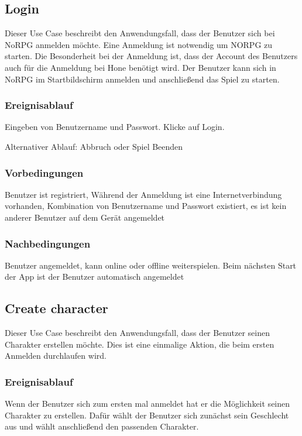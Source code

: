 	\subsection{Login}
		Dieser Use Case beschreibt den Anwendungsfall, dass der Benutzer sich bei NoRPG anmelden möchte. Eine Anmeldung ist notwendig um NORPG zu starten. Die Besonderheit bei der Anmeldung  ist, dass der Account des Benutzers auch für die Anmeldung bei Hone benötigt wird. Der Benutzer kann sich in NoRPG im Startbildschirm anmelden und anschließend das Spiel zu starten.
			
		\subsubsection{Ereignisablauf}
			Eingeben von Benutzername und Passwort.	Klicke auf Login.
			
			Alternativer Ablauf: Abbruch oder Spiel Beenden
			
		\subsubsection{Vorbedingungen}
			Benutzer ist registriert, Während der Anmeldung ist eine Internetverbindung vorhanden, Kombination von Benutzername und Passwort existiert, es ist kein anderer Benutzer auf dem Gerät angemeldet
			
		\subsubsection{Nachbedingungen}
			Benutzer angemeldet, kann online oder offline weiterspielen. Beim nächsten Start der App ist der Benutzer automatisch angemeldet
	
	\subsection{Create character}
		Dieser Use Case beschreibt den Anwendungsfall, dass der Benutzer seinen Charakter erstellen möchte. Dies ist eine einmalige Aktion, die beim ersten Anmelden durchlaufen wird. 
			
		\subsubsection{Ereignisablauf}
			Wenn der Benutzer sich zum ersten mal anmeldet hat er die Möglichkeit seinen Charakter zu erstellen. Dafür wählt der Benutzer sich zunächst sein Geschlecht aus und wählt anschließend den passenden Charakter.
			
